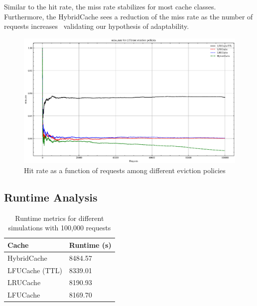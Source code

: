Similar to the hit rate, the miss rate stabilizes
for most cache classes. Furthermore, the HybridCache
sees a reduction of the miss rate as the
number of requests increases \textemdash~validating
our hypothesis of adaptability.

\begin{figure}[!htp]
    \centering
    \includegraphics[width=\textwidth]{images/miss_rate_plot.eps} %
    \caption{Hit rate as a function of requests among different eviction policies}
    \label{fig:miss_rate_plot}
\end{figure}

\subsection{Runtime Analysis}

\begin{table}[ht]
    \centering
    \caption{Runtime metrics for different simulations with 100,000 requests}
    \label{tab:test_simulation_metrics}
    \begin{tabularx}{\linewidth}{XX}
        \toprule
        \textbf{Cache} & \textbf{Runtime (s)} \\
        \midrule
        HybridCache & 8484.57\\
        LFUCache (TTL) & 8339.01\\
        LRUCache & 8190.93\\
        LFUCache & 8169.70\\
        \bottomrule
    \end{tabularx}
\end{table}